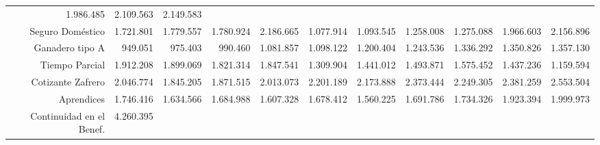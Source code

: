 \begin{tabular}{lllllllllll}
  \multicolumn{1}{r}{1.986.485} &
  \multicolumn{1}{r}{2.109.563} &
  \multicolumn{1}{r}{2.149.583} \\
\multicolumn{1}{r}{Seguro Doméstico\hspace{1em}} &
  \multicolumn{1}{|r}{1.721.801} &
  \multicolumn{1}{r}{1.779.557} &
  \multicolumn{1}{r}{1.780.924} &
  \multicolumn{1}{r}{2.186.665} &
  \multicolumn{1}{r}{1.077.914} &
  \multicolumn{1}{r}{1.093.545} &
  \multicolumn{1}{r}{1.258.008} &
  \multicolumn{1}{r}{1.275.088} &
  \multicolumn{1}{r}{1.966.603} &
  \multicolumn{1}{r}{2.156.896} \\
\multicolumn{1}{r}{Ganadero tipo A\hspace{1em}} &
  \multicolumn{1}{|r}{949.051} &
  \multicolumn{1}{r}{975.403} &
  \multicolumn{1}{r}{990.460} &
  \multicolumn{1}{r}{1.081.857} &
  \multicolumn{1}{r}{1.098.122} &
  \multicolumn{1}{r}{1.200.404} &
  \multicolumn{1}{r}{1.243.536} &
  \multicolumn{1}{r}{1.336.292} &
  \multicolumn{1}{r}{1.350.826} &
  \multicolumn{1}{r}{1.357.130} \\
\multicolumn{1}{r}{Tiempo Parcial\hspace{1em}} &
  \multicolumn{1}{|r}{1.912.208} &
  \multicolumn{1}{r}{1.899.069} &
  \multicolumn{1}{r}{1.821.314} &
  \multicolumn{1}{r}{1.847.541} &
  \multicolumn{1}{r}{1.309.904} &
  \multicolumn{1}{r}{1.441.012} &
  \multicolumn{1}{r}{1.493.871} &
  \multicolumn{1}{r}{1.575.452} &
  \multicolumn{1}{r}{1.437.236} &
  \multicolumn{1}{r}{1.159.594} \\
\multicolumn{1}{r}{Cotizante Zafrero\hspace{1em}} &
  \multicolumn{1}{|r}{2.046.774} &
  \multicolumn{1}{r}{1.845.205} &
  \multicolumn{1}{r}{1.871.515} &
  \multicolumn{1}{r}{2.013.073} &
  \multicolumn{1}{r}{2.201.189} &
  \multicolumn{1}{r}{2.173.888} &
  \multicolumn{1}{r}{2.373.444} &
  \multicolumn{1}{r}{2.249.305} &
  \multicolumn{1}{r}{2.381.259} &
  \multicolumn{1}{r}{2.553.504} \\
\multicolumn{1}{r}{Aprendices\hspace{1em}} &
  \multicolumn{1}{|r}{1.746.416} &
  \multicolumn{1}{r}{1.634.566} &
  \multicolumn{1}{r}{1.684.988} &
  \multicolumn{1}{r}{1.607.328} &
  \multicolumn{1}{r}{1.678.412} &
  \multicolumn{1}{r}{1.560.225} &
  \multicolumn{1}{r}{1.691.786} &
  \multicolumn{1}{r}{1.734.326} &
  \multicolumn{1}{r}{1.923.394} &
  \multicolumn{1}{r}{1.999.973} \\
\multicolumn{1}{r}{Continuidad en el Benef.\hspace{1em}} &
  \multicolumn{1}{|r}{4.260.395} &

\end{tabular}
